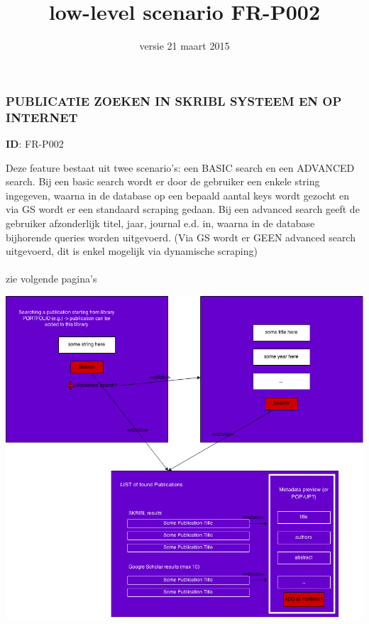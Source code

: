 \documentclass{article}
\begin{document}
\date{versie 21 maart 2015}
\title{low-level scenario FR-P002}
\maketitle


\subsubsection*{PUBLICATIE ZOEKEN IN SKRIBL SYSTEEM EN OP INTERNET}
\vspace{2 mm}

\textbf{ID}: FR-P002
\vspace{2 mm}


\noindent Deze feature bestaat uit twee scenario's: een BASIC search en een ADVANCED search. Bij een basic search wordt er door de gebruiker een enkele string ingegeven, waarna in de database op een bepaald aantal keys wordt gezocht en via GS wordt er een standaard scraping gedaan. Bij een advanced search geeft de gebruiker afzonderlijk titel, jaar, journal e.d. in, waarna in de database bijhorende queries worden uitgevoerd. (Via GS wordt er GEEN advanced search uitgevoerd, dit is enkel mogelijk via dynamische scraping)
\\
\\
zie volgende pagina's

\includegraphics[width=1.3\textwidth]{basic-advanced-search.png}
\end{document}
